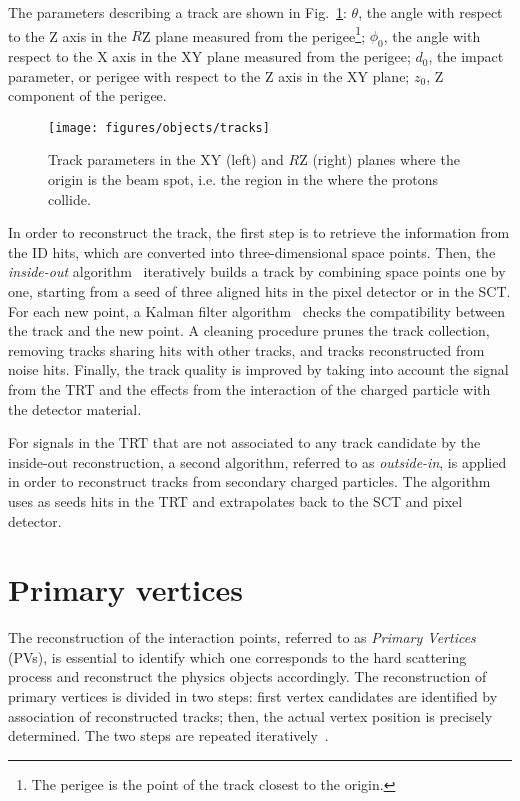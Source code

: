 The parameters describing a track are shown in
Fig.~\ref{fig:trackpar}: $\theta$, the angle with respect to the Z axis in the
$R$Z plane measured from the perigee\footnote{The perigee is the point
  of the track closest to the origin.}; $\phi_0$, the angle with
respect to the X axis in the XY plane measured from the perigee;
$d_0$, the impact parameter, or perigee with respect to the Z axis in
the XY plane; $z_0$, Z component of the perigee. 

\begin{figure}[htb!]
  \centering
  \texttt{[image: figures/objects/tracks]}
  \caption{Track parameters in the XY (left) and $R$Z (right) planes
    where the origin is the beam spot, i.e. the region in the where
    the protons collide. 
    \label{fig:trackpar}}
\end{figure}

In order to reconstruct the track, the first step is to retrieve the
information from the ID hits, which are converted into
three-dimensional space points. Then, the {\it inside-out}
algorithm~\cite{insideoutalgo}  iteratively builds a track by
combining space points one by one, starting from a seed of three
aligned hits in the pixel detector or in the SCT. 
For each new point, a Kalman filter algorithm~\cite{kalmanfilter}
checks the compatibility between the track and the new point. 
A cleaning procedure prunes the track collection, removing 
tracks sharing hits with other tracks, and tracks reconstructed from
noise hits. 
Finally, the track quality is improved by taking into account the
signal from the TRT and the effects from the interaction of the
charged particle with the detector material. 

For signals in the TRT that are not associated to any track candidate
by the inside-out reconstruction, a second algorithm,
referred to as {\it outside-in}, is applied in order to
reconstruct tracks from secondary charged particles. 
The algorithm uses as seeds hits in the TRT
and extrapolates back to the SCT and pixel detector.

\section{Primary vertices}
\label{sec:pv}

The reconstruction of the interaction points, referred to as {\it Primary
  Vertices} (PVs), is essential to identify which one corresponds to
the hard scattering process and reconstruct the physics
objects accordingly. The reconstruction of primary vertices is divided
in two steps: first vertex candidates are identified by association
of reconstructed tracks; then, the actual vertex position is precisely
determined. The two steps are repeated iteratively~\cite{vertexalgo}.

